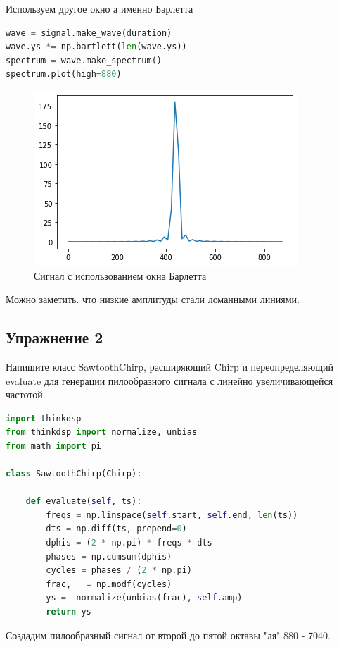 Используем другое окно а именно Барлетта

\begin{lstlisting}[language=Python]
wave = signal.make_wave(duration)
wave.ys *= np.bartlett(len(wave.ys))
spectrum = wave.make_spectrum()
spectrum.plot(high=880)
\end{lstlisting}
\begin{figure}[H]
	\begin{center}
		\includegraphics[scale=1]{fig/lab03/lab03_3.png}
		\caption{Сигнал с использованием окна Барлетта}
	\end{center}
\end{figure}

Можно заметить. что низкие амплитуды стали ломанными линиями.

\subsection{Упражнение 2}


Напишите класс SawtoothChirp, расширяющий Chirp и переопределяющий evaluate для генерации пилообразного сигнала с линейно увеличивающейся частотой.

\begin{lstlisting}[language=Python]
import thinkdsp
from thinkdsp import normalize, unbias
from math import pi

class SawtoothChirp(Chirp):

    def evaluate(self, ts):
        freqs = np.linspace(self.start, self.end, len(ts))
        dts = np.diff(ts, prepend=0)
        dphis = (2 * np.pi) * freqs * dts
        phases = np.cumsum(dphis)
        cycles = phases / (2 * np.pi)
        frac, _ = np.modf(cycles)
        ys =  normalize(unbias(frac), self.amp)
        return ys
\end{lstlisting}

Создадим пилообразный сигнал от второй до пятой октавы "ля" 880 - 7040.

